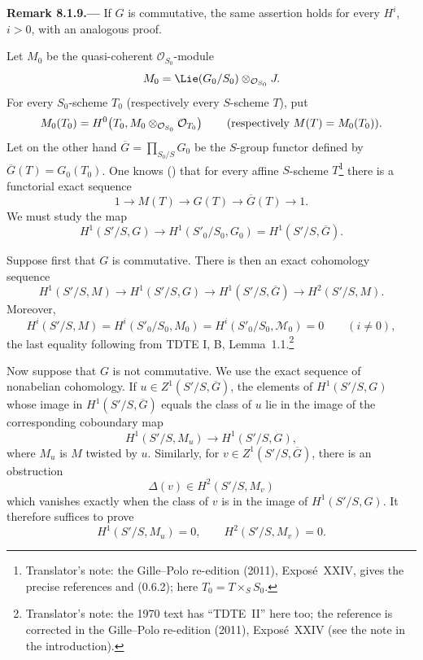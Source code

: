 \par\medskip\noindent{}\textbf{Remark 8.1.9.---}\enspace
If \(G\) is commutative, the same assertion holds for every
\(H^i\), \(i>0\), with an analogous proof.

Let \(M_0\) be the quasi-coherent \(\mathcal O_{S_0}\)-module
\[
  M_0
  =
  \Lie(G_0/S_0)\otimes_{\mathcal O_{S_0}}J.
\]
For every \(S_0\)-scheme \(T_0\) \textup{(}respectively every \(S\)-scheme \(T\)\textup{)}, put
\[
  M_0(T_0)
  =
  H^0\!\left(
    T_0,
    M_0\otimes_{\mathcal O_{S_0}}\mathcal O_{T_0}
  \right)
  \qquad\textup{(}\text{respectively }M(T)=M_0(T_0)\textup{)}.
\]
Let on the other hand \(\overline G=\prod_{S_0/S}G_0\) be the \(S\)-group functor defined by
\(\overline G(T)=G_0(T_0)\). One knows () that for every affine
\(S\)-scheme \(T\)\footnote{Translator's note: the Gille--Polo re-edition (2011), Exposé~XXIV, gives the precise references
 and (0.6.2); here \(T_0=T\times_SS_0\).}
there is a functorial exact sequence
\[
  1\longrightarrow M(T)\longrightarrow G(T)
  \longrightarrow\overline G(T)\longrightarrow1.
\]
We must study the map
\[
  H^1(S'/S,G)
  \longrightarrow
  H^1(S'_0/S_0,G_0)
  =
  H^1(S'/S,\overline G).
\]

Suppose first that \(G\) is commutative. There is then an exact
cohomology sequence
\[
  H^1(S'/S,M)
  \longrightarrow H^1(S'/S,G)
  \longrightarrow H^1(S'/S,\overline G)
  \longrightarrow H^2(S'/S,M).
\]
Moreover,
\[
  H^i(S'/S,M)
  =
  H^i(S'_0/S_0,M_0)
  =
  H^i(S'_0/S_0,\mathcal M_0)
  =
  0
  \qquad(i\neq0),
\]
the last equality following from TDTE I, B, Lemma~1.1.\footnote{Translator's note: the 1970 text
has ``TDTE~II'' here too; the reference is corrected in the Gille--Polo re-edition (2011),
Exposé~XXIV (see the note in the introduction).}

Now suppose that \(G\) is not commutative. We use the exact sequence
of nonabelian cohomology. If
\(u\in Z^1(S'/S,\overline G)\), the elements of \(H^1(S'/S,G)\) whose
image in \(H^1(S'/S,\overline G)\) equals the class of \(u\) lie in the
image of the corresponding coboundary map
\[
  H^1(S'/S,M_u)\longrightarrow H^1(S'/S,G),
\]
where \(M_u\) is \(M\) twisted by \(u\). Similarly, for
\(v\in Z^1(S'/S,\overline G)\), there is an obstruction
\[
  \Delta(v)\in H^2(S'/S,M_v)
\]
which vanishes exactly when the class of \(v\) is in the image of
\(H^1(S'/S,G)\). It therefore suffices to prove
\[
  H^1(S'/S,M_u)=0,
  \qquad
  H^2(S'/S,M_v)=0.
\]


